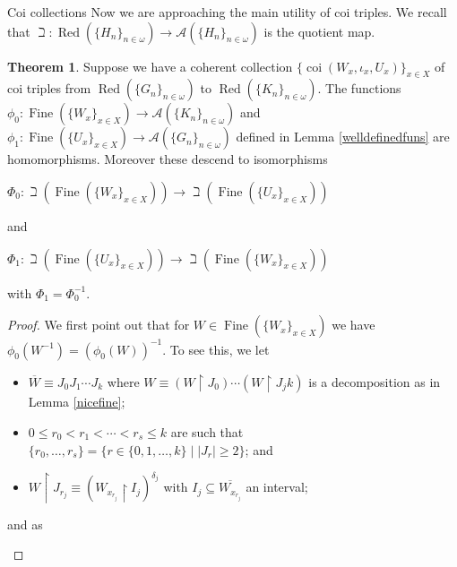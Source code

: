 \documentclass{amsart}
\theoremstyle{definition}\newtheorem{theorem}{Theorem}
\theoremstyle{definition}\newtheorem*{A}{Main Theorem}
\theoremstyle{definition}\newtheorem*{B}{Theorem \ref{elementaryequiv}}
\theoremstyle{definition}\newtheorem*{C}{Theorem \ref{continuous}}
\theoremstyle{definition}\newtheorem*{D}{Theorem \ref{bigisomorphism2}}
\theoremstyle{definition}\newtheorem{bigtheorem}{Main Theorem}
\numberwithin{theorem}{section}
\theoremstyle{definition}\newtheorem{corollary}[theorem]{Corollary}
\theoremstyle{definition}\newtheorem{proposition}[theorem]{Proposition}
\theoremstyle{definition}\newtheorem{definition}[theorem]{Definition}
\theoremstyle{definition}\newtheorem{question}[theorem]{Question}
\theoremstyle{definition}\newtheorem{example}[theorem]{Example}
\theoremstyle{definition}\newtheorem{remark}[theorem]{Remark}
\theoremstyle{definition}\newtheorem{note}[theorem]{Note}
\theoremstyle{definition}\newtheorem{lemma}[theorem]{Lemma}
\theoremstyle{definition}\newtheorem{fact}[theorem]{Fact}
\theoremstyle{definition}\newtheorem{define}[theorem]{Definition}
\theoremstyle{definition}\newtheorem{claim}[theorem]{Claim}
\theoremstyle{definition}\newtheorem{obs}[theorem]{Observation}
\theoremstyle{definition}\newtheorem{definitions}[theorem]{Definitions}
\newcommand{\Red}{\operatorname{Red}}
\newcommand{\Fine}{\operatorname{Fine}}
\newcommand{\coi}{\operatorname{coi}}
\begin{document}
\begin{section}{Coi collections}
Now we are approaching the main utility of coi triples.  We recall that $\beth: \Red(\{H_n\}_{n \in \omega}) \rightarrow \mathcal{A}(\{H_n\}_{n \in \omega})$ is the quotient map.

\begin{theorem}\label{coicollectiongivesiso}  Suppose we have a coherent collection $\{\coi(W_x, \iota_x, U_x)\}_{x \in X}$ of coi triples from $\Red(\{G_n\}_{n \in \omega})$ to $\Red(\{K_n\}_{n \in \omega})$.  The functions $\phi_0 : \Fine(\{W_x\}_{x \in X}) \rightarrow \mathcal{A}(\{K_n\}_{n \in \omega})$ and $\phi_1: \Fine(\{U_x\}_{x \in X}) \rightarrow \mathcal{A}(\{G_n\}_{n \in \omega})$ defined in Lemma \ref{welldefinedfuns} are homomorphisms.  Moreover these descend to isomorphisms

\begin{center}
$\Phi_0: \beth(\Fine(\{W_x\}_{x \in X})) \rightarrow \beth(\Fine(\{U_x\}_{x \in X}))$
\end{center}

\noindent and

\begin{center}
$\Phi_1:  \beth(\Fine(\{U_x\}_{x \in X})) \rightarrow \beth(\Fine(\{W_x\}_{x \in X}))$
\end{center}

\noindent with $\Phi_1 = \Phi_0^{-1}$.
\end{theorem}

\begin{proof}  We first point out that for $W \in \Fine(\{W_x\}_{x \in X})$ we have $\phi_0(W^{-1}) = (\phi_0(W))^{-1}$.  To see this, we let

\begin{itemize}

\item $\overline{W} \equiv J_0J_1 \cdots J_k$ where $W \equiv (W \upharpoonright J_0) \cdots (W \upharpoonright J_jk)$ is a decomposition as in Lemma \ref{nicefine};

\item $0 \leq r_0 < r_1 < \cdots < r_s \leq k$ are such that $\{r_0, \ldots, r_s\} = \{r \in \{0, 1, \ldots, k\}\mid |J_r| \geq 2\}$; and 

\item $W \upharpoonright J_{r_j} \equiv (W_{x_{r_j}} \upharpoonright I_j)^{\delta_j}$ with $I_j \subseteq \overline{W_{x_{r_j}}}$ an interval;
\end{itemize}

\noindent and as 

\begin{itemize}


\end{itemize}
\end{proof}
\end{section}
\end{document}
